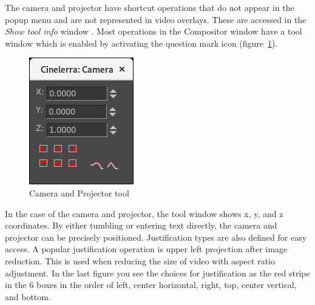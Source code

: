 The camera and projector have shortcut operations that do not appear in the popup menu and are not represented in video overlays. 
These are accessed in the \emph{Show tool info} window . 
Most operations in the Compositor window have a tool window which is enabled by activating the question mark icon (figure~\ref{fig:camera_tool}).

\begin{figure} 
	\vspace{-2ex}
    \includegraphics[width=0.9\linewidth]{images/camera_tool.png}
    \caption{Camera and Projector tool}
    \label{fig:camera_tool}
\end{figure}

In the case of the camera and projector, the tool window shows x, y, and z coordinates. 
By either tumbling or entering text directly, the camera and projector can be precisely positioned.  
Justification types are also defined for easy access. 
A popular justification operation is upper left projection after image reduction. 
This is used when reducing the size of video with aspect ratio adjustment.  
In the last figure you see the choices for justification as the red stripe in the 6 boxes in the order of left, center horizontal, right, top, center vertical, and bottom.

